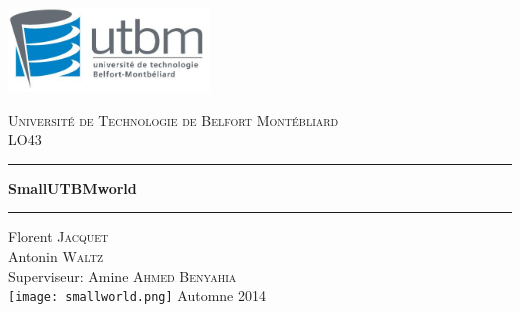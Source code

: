 \documentclass[a4paper]{report}
\begin{document}
\begin{titlepage}
    \includegraphics[width=0.4\textwidth]{logo_utbm.png}
    \begin{center}
        \textsc{\LARGE Université de Technologie de Belfort Montébliard}\\[1cm]
        \textsc{\Large LO43}\\
        \rule{\linewidth}{0.5mm}
        { \huge \bfseries SmallUTBMworld\\[0.4cm] }
        \rule{\linewidth}{0.5mm}
        \vskip1cm
        Florent \textsc{Jacquet}\\
        Antonin \textsc{Waltz}\\
        Superviseur: Amine \textsc{Ahmed Benyahia}\\
        \vskip1cm
        \texttt{[image: smallworld.png]}
        \vfill
        {\large Automne 2014}
    \end{center}
\end{titlepage}


\newpage
\end{document}
